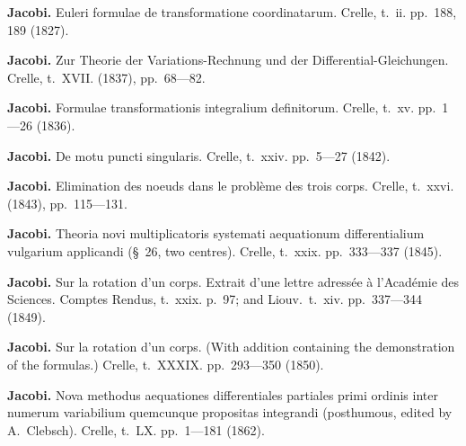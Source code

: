 \documentclass[12pt,a4paper]{article}
\theoremstyle{definition}
\begin{document}
\vspace{0.5em}

\noindent\textbf{Jacobi.} Euleri formulae de transformatione coordinatarum. Crelle, t.~ii. pp.~188, 189 (1827).

\vspace{0.5em}

\noindent\textbf{Jacobi.} Zur Theorie der Variations-Rechnung und der Differential-Gleichungen. Crelle, t.~XVII. (1837), pp.~68---82.

\vspace{0.5em}

\noindent\textbf{Jacobi.} Formulae transformationis integralium definitorum. Crelle, t.~xv. pp.~1---26 (1836).

\vspace{0.5em}

\noindent\textbf{Jacobi.} De motu puncti singularis. Crelle, t.~xxiv. pp.~5---27 (1842).

\vspace{0.5em}

\noindent\textbf{Jacobi.} Elimination des noeuds dans le probl\`{e}me des trois corps. Crelle, t.~xxvi. (1843), pp.~115---131.

\vspace{0.5em}

\noindent\textbf{Jacobi.} Theoria novi multiplicatoris systemati aequationum differentialium vulgarium applicandi (\S~26, two centres). Crelle, t.~xxix. pp.~333---337 (1845).

\vspace{0.5em}

\noindent\textbf{Jacobi.} Sur la rotation d'un corps. Extrait d'une lettre adress\'{e}e \`{a} l'Acad\'{e}mie des Sciences. Comptes Rendus, t.~xxix. p.~97; and Liouv.~t.~xiv. pp.~337---344 (1849).

\vspace{0.5em}

\noindent\textbf{Jacobi.} Sur la rotation d'un corps. (With addition containing the demonstration of the formulas.) Crelle, t.~XXXIX. pp.~293---350 (1850).

\vspace{0.5em}

\noindent\textbf{Jacobi.} Nova methodus aequationes differentiales partiales primi ordinis inter numerum variabilium quemcunque propositas integrandi (posthumous, edited by A.~Clebsch). Crelle, t.~LX. pp.~1---181 (1862).

\vspace{0.5em}
\end{document}
